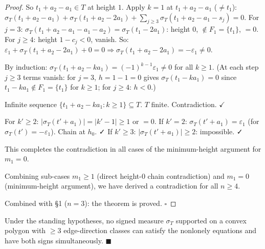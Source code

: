 \begin{proof}
  So $t_1+a_2-a_1\in T$ at height $1$.
  Apply $k=1$ at $t_1+a_2-a_1$ ($\neq t_1$):
  $\sigma_T(t_1+a_2-a_1)+\sigma_T(t_1+a_2-2a_1)+\sum_{j\geq 3}\sigma_T(t_1+a_2-a_1-s_j)=0$.
  For $j=3$: $\sigma_T(t_1+a_2-a_1-a_1-a_2)=\sigma_T(t_1-2a_1)$: height $0$, $\notin F_1=\{t_1\}$, $=0$.
  For $j\geq 4$: height $1-c_j<0$, vanish.
  So: $\varepsilon_1+\sigma_T(t_1+a_2-2a_1)+0=0\Rightarrow\sigma_T(t_1+a_2-2a_1)=-\varepsilon_1\neq 0$.

  By induction: $\sigma_T(t_1+a_2-ka_1)=(-1)^{k-1}\varepsilon_1\neq 0$ for all $k\geq 1$.
  (At each step $j\geq 3$ terms vanish: for $j=3$, $h=1-1=0$ gives $\sigma_T(t_1-ka_1)=0$ since
  $t_1-ka_1\notin F_1=\{t_1\}$ for $k\geq 1$; for $j\geq 4$: $h<0$.)

  Infinite sequence $\{t_1+a_2-ka_1:k\geq 1\}\subseteq T$. $T$ finite. Contradiction. $\checkmark$

For $k'\geq 2$: $|\sigma_T(t'+a_1)|=|k'-1|\geq 1$ or $=0$.
  If $k'=2$: $\sigma_T(t'+a_1)=\varepsilon_1$ (for $\sigma_T(t')=-\varepsilon_1$). Chain at $h_0$. ✓
  If $k'\geq 3$: $|\sigma_T(t'+a_1)|\geq 2$: impossible. ✓

This completes the contradiction in all cases of the minimum-height argument for $m_1=0$.

\medskip

Combining sub-cases $m_1\geq 1$ (direct height-0 chain contradiction) and $m_1=0$
(minimum-height argument), we have derived a contradiction for all $n\geq 4$.

Combined with \S 1 ($n=3$): the theorem is proved. $\square$
\end{proof}

\begin{corollary}
Under the standing hypotheses, no signed measure $\sigma_T$ supported on a convex
polygon with $\geq 3$ edge-direction classes can satisfy the nonlonely equations
and have both signs simultaneously. $\blacksquare$
\end{corollary}
